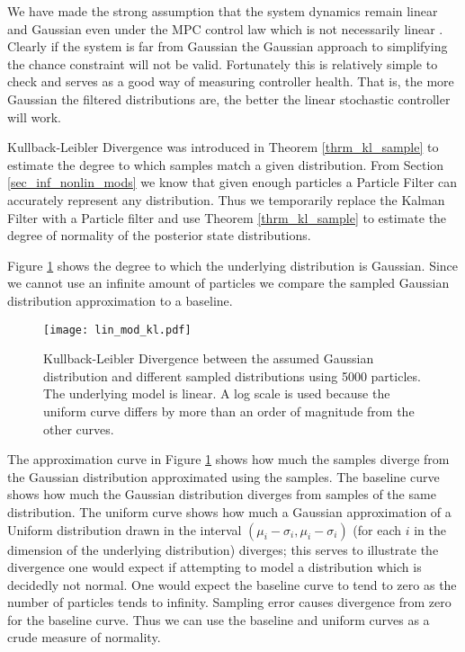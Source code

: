 We have made the strong assumption that the system dynamics remain linear and Gaussian even under the MPC control law which is not necessarily linear \cite{mac}. Clearly if the system is far from Gaussian the Gaussian approach to simplifying the chance constraint will not be valid. Fortunately this is relatively simple to check and serves as a good way of measuring controller health. That is, the more Gaussian the filtered distributions are, the better the linear stochastic controller will work. 

Kullback-Leibler Divergence was introduced in Theorem \ref{thrm_kl_sample} to estimate the degree to which samples match a given distribution. From Section \ref{sec_inf_nonlin_mods} we know that given enough particles a Particle Filter can accurately represent any distribution. Thus we temporarily replace the Kalman Filter with a Particle filter and use Theorem \ref{thrm_kl_sample} to estimate the degree of normality of the posterior state distributions.

Figure \ref{fig_lin_mod_kl} shows the degree to which the underlying distribution is Gaussian. Since we cannot use an infinite amount of particles we compare the sampled Gaussian distribution approximation to a baseline.   
\begin{figure}[H] 
\centering
\texttt{[image: lin\_mod\_kl.pdf]}
\caption{Kullback-Leibler Divergence between the assumed Gaussian distribution and different sampled distributions using 5000 particles. The underlying model is linear. A log scale is used because the uniform curve differs by more than an order of magnitude from the other curves.}
\label{fig_lin_mod_kl}
\end{figure}
The approximation curve in Figure \ref{fig_lin_mod_kl} shows how much the samples diverge from the Gaussian distribution approximated using the samples. The baseline curve shows how much the Gaussian distribution diverges from samples of the same distribution. The uniform curve shows how much a Gaussian approximation of a Uniform distribution drawn in the interval $(\mu_i-\sigma_i, \mu_i-\sigma_i)$ (for each $i$ in the dimension of the underlying distribution) diverges; this serves to illustrate the divergence one would expect if attempting to model a distribution which is decidedly not normal. One would expect the baseline curve to tend to zero as the number of particles tends to infinity. Sampling error causes divergence from zero for the baseline curve. Thus we can use the baseline and uniform curves as a crude measure of normality.


